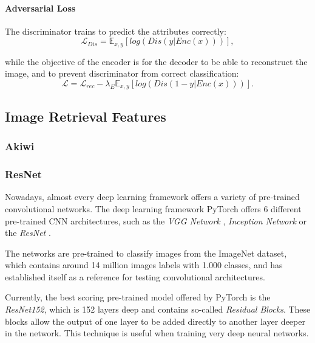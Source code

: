 \documentclass{article}
\begin{document}
\paragraph{Adversarial Loss}
The discriminator trains to predict the attributes correctly:
\begin{equation}
\mathcal{L}_{Dis} = \mathbb{E}_{x,y}[log(Dis(y|Enc(x)))],
\end{equation}

while the objective of the encoder is for the decoder to be able to reconstruct the image, and to prevent discriminator from correct classification:
\begin{equation}
\mathcal{L} = \mathcal{L}_{rec} - \lambda_E \mathbb{E}_{x,y}[log(Dis(1-y|Enc(x)))].
\end{equation}


\pagebreak
\subsection{Image Retrieval Features}



\subsubsection{Akiwi}

\subsubsection{ResNet}
Nowadays, almost every deep learning framework offers a variety of pre-trained convolutional networks. The deep learning framework PyTorch offers 6 different pre-trained CNN architectures, such as the \textit{VGG Network} \cite{simonyan_very_2014}, \textit{Inception Network} \cite{szegedy_rethinking_2015} or the \textit{ResNet} \cite{he_deep_2015}. 

The networks are pre-trained to classify images from the ImageNet dataset, which contains around 14 million images labels with 1.000 classes, and has established itself as a reference for testing convolutional architectures. 

Currently, the best scoring pre-trained model offered by PyTorch is the \textit{ResNet152}, which is 152 layers deep and contains so-called \textit{Residual Blocks}. These blocks allow the output of one layer to be added directly to another layer deeper in the network. This technique is useful when training very deep neural networks.
\end{document}
